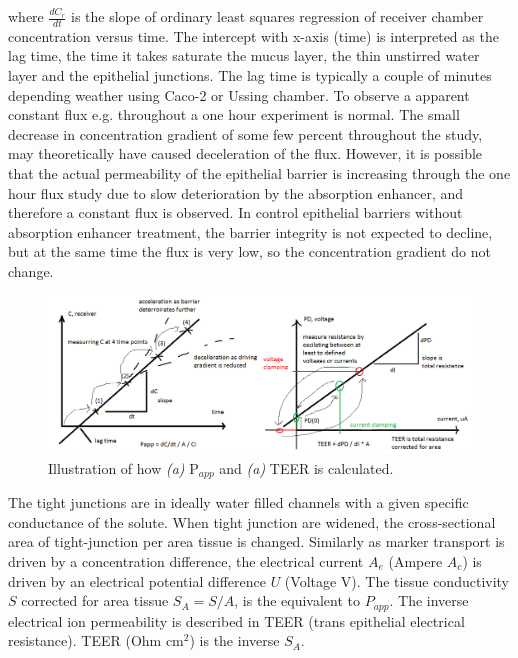 where $\frac{dC_r}{dt}$ is the slope of ordinary least squares regression of receiver chamber concentration versus time. The intercept with x-axis (time) is interpreted as the lag time, the time it takes saturate the mucus layer, the thin unstirred water layer and the epithelial junctions. The lag time is typically a couple of minutes depending weather using Caco-2 or Ussing chamber. To observe a apparent constant flux e.g. throughout a one hour experiment is normal. The small decrease in concentration gradient of some few percent throughout the study, may theoretically have caused deceleration of the flux. However, it is possible that the actual permeability of the epithelial barrier is increasing through the one hour flux study due to slow deterioration by the absorption enhancer, and therefore a constant flux is observed. In control epithelial barriers without absorption enhancer treatment, the barrier integrity is not expected to decline, but at the same time the flux is very low, so the concentration gradient do not change.

\begin{figure}[ht]
\label{meassure_TEERPapp}
\includegraphics[width=\textwidth,height=\textheight,keepaspectratio]{graphics/sketch_measuring_permeability.png}
\caption{Illustration of how \textit{(a)} P$_{app}$ and \textit{(a)}  TEER is calculated.}
\end{figure}


The tight junctions are in ideally water filled channels with a given specific conductance of the solute. When tight junction are widened, the cross-sectional area of tight-junction per area tissue is changed. Similarly as marker transport is driven by a concentration difference, the electrical current $A_{e}$ (Ampere $A_c$) is driven by an electrical potential difference $U$ (Voltage V). The tissue conductivity $S$ corrected for area tissue $S_A = S/A$, is the equivalent to $P_{app}$. The inverse electrical ion permeability is described in TEER (trans epithelial electrical resistance). TEER (Ohm cm$^2$) is the inverse $S_A$.

